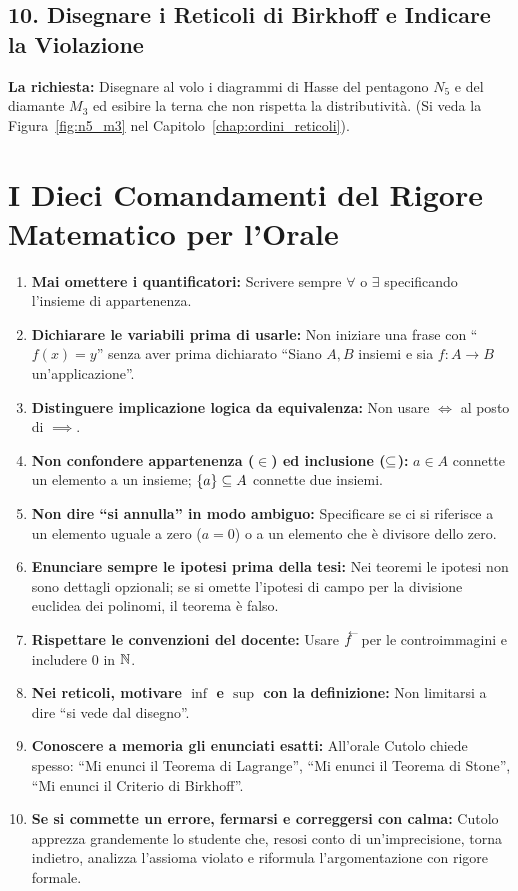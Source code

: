 \subsection{10. Disegnare i Reticoli di Birkhoff e Indicare la Violazione}
\textbf{La richiesta:} Disegnare al volo i diagrammi di Hasse del pentagono $N_5$ e del diamante $M_3$ ed esibire la terna che non rispetta la distributività. (Si veda la Figura~\ref{fig:n5_m3} nel Capitolo~\ref{chap:ordini_reticoli}).

\section{I Dieci Comandamenti del Rigore Matematico per l'Orale}

\begin{enumerate}
    \item \textbf{Mai omettere i quantificatori:} Scrivere sempre $\forall$ o $\exists$ specificando l'insieme di appartenenza.
    \item \textbf{Dichiarare le variabili prima di usarle:} Non iniziare una frase con ``$f(x) = y$'' senza aver prima dichiarato ``Siano $A, B$ insiemi e sia $f: A \to B$ un'applicazione''.
    \item \textbf{Distinguere implicazione logica da equivalenza:} Non usare $\iff$ al posto di $\implies$.
    \item \textbf{Non confondere appartenenza ($\in$) ed inclusione ($\subseteq$):} $a \in A$ connette un elemento a un insieme; $\{a\} \subseteq A$ connette due insiemi.
    \item \textbf{Non dire ``si annulla'' in modo ambiguo:} Specificare se ci si riferisce a un elemento uguale a zero ($a = 0$) o a un elemento che è divisore dello zero.
    \item \textbf{Enunciare sempre le ipotesi prima della tesi:} Nei teoremi le ipotesi non sono dettagli opzionali; se si omette l'ipotesi di campo per la divisione euclidea dei polinomi, il teorema è falso.
    \item \textbf{Rispettare le convenzioni del docente:} Usare $\antivecf$ per le controimmagini e includere $0$ in $\mathbb{N}$.
    \item \textbf{Nei reticoli, motivare $\inf$ e $\sup$ con la definizione:} Non limitarsi a dire ``si vede dal disegno''.
    \item \textbf{Conoscere a memoria gli enunciati esatti:} All'orale Cutolo chiede spesso: ``Mi enunci il Teorema di Lagrange'', ``Mi enunci il Teorema di Stone'', ``Mi enunci il Criterio di Birkhoff''.
    \item \textbf{Se si commette un errore, fermarsi e correggersi con calma:} Cutolo apprezza grandemente lo studente che, resosi conto di un'imprecisione, torna indietro, analizza l'assioma violato e riformula l'argomentazione con rigore formale.
\end{enumerate}
